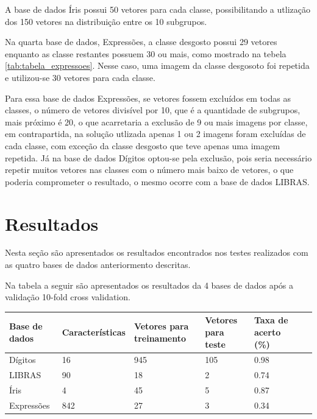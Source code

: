 A base de dados Íris possui 50 vetores para cada classe, possibilitando a utlização dos 150 vetores na distribuição entre os 10 subgrupos.

Na quarta base de dados, Expressões, a classe desgosto possui 29 vetores enquanto as classe restantes possuem 30 ou mais, como mostrado na tebela \ref{tab:tabela_expressoes}. Nesse caso, uma imagem da classe desgosoto foi repetida e utilizou-se 30 vetores para cada classe. 

Para essa base de dados Expressões, se vetores fossem excluídos em todas as classes, o número de vetores divisível por 10, que é a quantidade de subgrupos, mais próximo é 20, o que acarretaria a exclusão de 9 ou mais imagens por classe, em contrapartida, na solução utlizada apenas 1 ou 2 imagens foram excluídas de cada classe, com exceção da classe desgosto que teve apenas uma imagem repetida. Já na base de dados Dígitos optou-se pela exclusão, pois seria necessário repetir muitos vetores nas classes com o número mais baixo de vetores, o que poderia comprometer o resultado, o mesmo ocorre com a base de dados LIBRAS.

\section{Resultados}
Nesta seção são apresentados os resultados encontrados nos testes realizados com as quatro bases de dados anteriormento descritas. 

Na tabela a seguir são apresentados os resultados da 4 bases de dados após a validação 10-fold cross validation.

\begin{table}[h!]
	\begin{tabular}{|l|l|l|l|p{2cm}|p{3cm}|p{2cm}|}
        \hline
	Base de dados  & Características & Vetores para treinamento & Vetores para teste & Taxa de acerto (\%)\\ \hline
    	Dígitos    &        16       & 945   & 105 & 0.98\\ \hline
   	LIBRAS     &        90       &  18   &   2 & 0.74\\ \hline
    	Íris       &         4       &  45   &   5 & 0.87\\ \hline
    	Expressões &       842       &  27   &   3 & 0.34\\ \hline
	\end{tabular}
	\label{tab:resultados}
\end{table}

